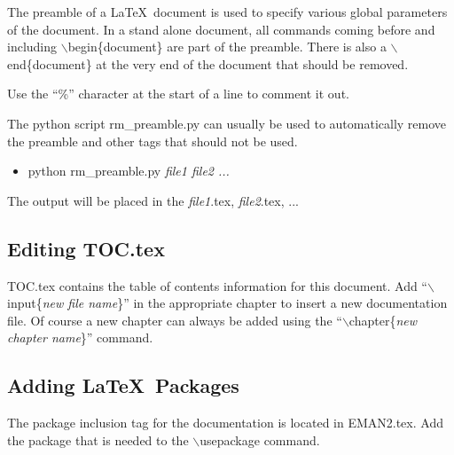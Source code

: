 The preamble of a \LaTeX ~document is used to specify various global
parameters of the document.  In a stand alone document, all commands
coming before and including $\backslash$begin\{document\} are part of the
preamble.  There is also a $\backslash$end\{document\} at the very end
of the document that should be removed.

Use the ``\%'' character at the  start of a line to comment it out.

The python script rm\_preamble.py can usually be used to automatically remove
the preamble and other tags that should not be used.
\begin {itemize}
  \item[\%] python rm\_preamble.py \textit{file1 file2 ...}
\end{itemize}
The output will be placed in the \textit{file1}.tex,
\textit{file2}.tex, ...

\subsection{Editing TOC.tex} \label{ADDING-DOC-TOC}

TOC.tex contains the table of contents information for this document.
Add ``$\backslash$input\{\textit{new file name}\}'' in the appropriate
chapter to insert a new documentation file.
Of course a new chapter can always be added using the
``$\backslash$chapter\{\textit{new chapter name}\}'' command.


\subsection{Adding \LaTeX ~Packages}

The package inclusion tag for the documentation is located in
EMAN2.tex.  Add the package that is needed to the
$\backslash$usepackage command.
